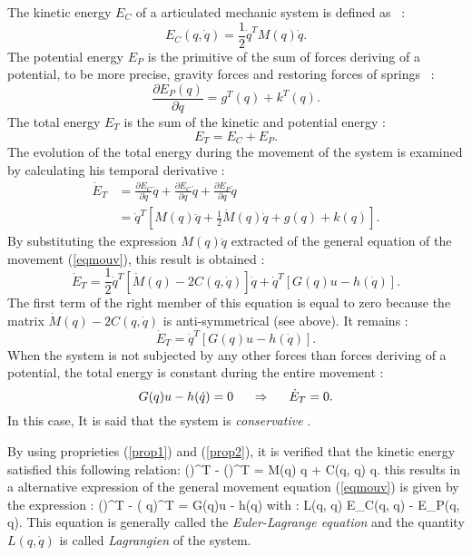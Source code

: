 The kinetic energy $E_C$ of a articulated mechanic system is defined as ~:
$$
E_C(q,\dot q) =  \frac{1}{2} \dot q^T M(q) \dot q.
$$
The potential energy  $E_P$ is the primitive of the sum of forces deriving of a potential, to be more precise, gravity forces and restoring forces of springs ~:
$$
\frac{\partial E_P(q)}{\partial q} = g^T(q) + k^T(q).
$$
The total energy $E_T$ is the sum of the kinetic and potential energy :
$$
E_T = E_C + E_P.
$$
The evolution of the total energy during the movement of the system is examined by calculating his temporal derivative :
\begin{equation} \begin{split}
\dot E_T &= \frac{\partial E_C}{\partial \dot q}\ddot q + \frac{\partial E_C}{\partial q}\dot q
+ \frac{\partial E_P}{\partial q}\dot q \\
&= \dot q^T [M(q) \ddot q + \frac{1}{2} \dot M(q) \dot q + g(q) + k(q)].
\end{split} \end{equation}
By substituting the expression  $M(q)\ddot q$ extracted of the general equation of the movement 
(\ref{eqmouv}), this result is obtained :
$$
\dot E_T = \frac{1}{2} \dot q^T [\dot M(q) - 2C(q,\dot q)] \dot q + \dot q^T [G(q)u - h(\dot q)].
$$
The first term of the right member of this equation is equal to zero because the matrix  $\dot M(q) - 2C(q,\dot q)$
is anti-symmetrical (see above). It remains :
$$
\dot E_T = \dot q^T [G(q)u - h(\dot q)].
$$
When the system is not subjected by any other forces than forces deriving of a potential, the total energy is constant during the entire movement :
$$
G(q)u - h(\dot q) = 0 \hspace{5mm} \Rightarrow \hspace{5mm} \dot E_T = 0.
$$
In this case, It is said that the system is  {\em conservative }.

By using proprieties (\ref{prop1}) and (\ref{prop2}), it is verified that the kinetic energy satisfied this following relation:
\eqnn
{}()^T - ()^T = 
M(q)  \ddot q + C(q, \dot q) \dot q.
\eeqnn
this results in a alternative expression of the general movement equation (\ref{eqmouv})
is given by the expression :
\eqnn
{} ()^T - (
{\partial q})^T = G(q)u - h(\dot q)
\eeqnn
with :
\eqnn
L(q, \dot q) \triangleq E_C(q, \dot q) - E_P(q, \dot q).
\eeqnn
This equation is generally called the {\em Euler-Lagrange equation} and the quantity  $L(q, \dot q)$ is called {\em Lagrangien} of the system.

